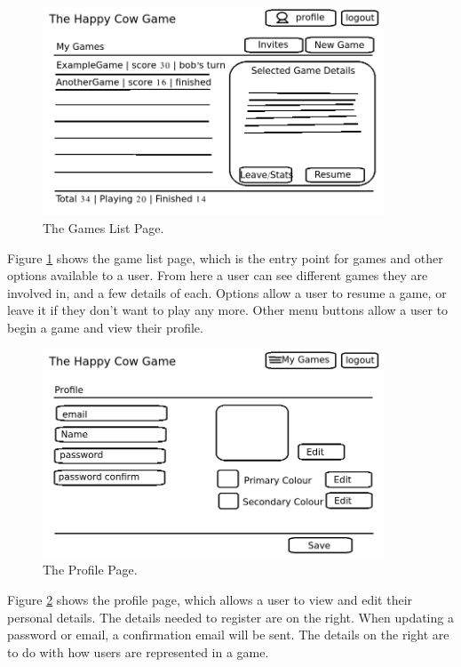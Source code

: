 \begin{figure}[ht]
\centering
\includegraphics[width=4in]{Images/2/pages-4-games}
\caption{The Games List Page.}
\label{2_page_games}
\end{figure}
Figure \ref{2_page_games} shows the game list page, which is the entry point for games and other options available to a user. From 
here a user can see different games they are involved in, and a few details of each. Options 
allow a user to resume a game, or leave it if they don’t want to play any more. Other menu 
buttons allow a user to begin a game and view their profile.

\begin{figure}[ht]
\centering
\includegraphics[width=4in]{Images/2/pages-5-profile}
\caption{The Profile Page.}
\label{2_page_profile}
\end{figure}
Figure \ref{2_page_profile} shows the profile page, which allows a user to view and edit their personal details. The details needed to register 
are on the right. When updating a password or email, a confirmation email will be sent. The 
details on the right are to do with how users are represented in a game. 

